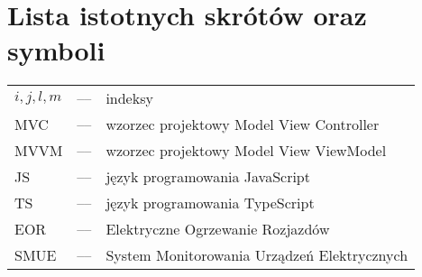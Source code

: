 \chapter*{Lista istotnych skrótów oraz symboli}

\noindent
\begin{tabularx}{\textwidth}{p{1.25cm}p{0.75cm}X}
	$i, j, l, m$	& --–	& indeksy \\
	MVC	& --– 	& wzorzec projektowy Model View Controller \\
	MVVM	& --– 	& wzorzec projektowy Model View ViewModel \\
	JS	& --– 	& język programowania JavaScript \\
	TS	& --– 	& język programowania TypeScript \\
	EOR	& --– 	& Elektryczne Ogrzewanie Rozjazdów \\
	SMUE & --– 	& System Monitorowania Urządzeń Elektrycznych \\
\end{tabularx}

